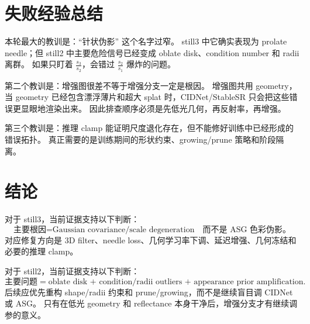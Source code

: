 \documentclass[11pt,a4paper]{article}
\begin{document}
\section{失败经验总结}

本轮最大的教训是：``针状伪影'' 这个名字过窄。
still3 中它确实表现为 prolate needle；但 still2 中主要危险信号已经变成 oblate disk、condition number 和 radii 离群。
如果只盯着 \(\frac{s_3}{s_2}\)，会错过 \(\frac{s_2}{s_1}\) 爆炸的问题。

第二个教训是：增强图很差不等于增强分支一定是根因。
增强图共用 geometry，当 geometry 已经包含漂浮薄片和超大 splat 时，CIDNet/StableSR 只会把这些错误更显眼地渲染出来。
因此排查顺序必须是先低光几何，再反射率，再增强。

第三个教训是：推理 clamp 能证明尺度退化存在，但不能修好训练中已经形成的错误拓扑。
真正需要的是训练期间的形状约束、growing/prune 策略和阶段隔离。

\section{结论}

对于 still3，当前证据支持以下判断：
\[
  \text{主要根因} =
  \text{Gaussian covariance/scale degeneration}
  \quad
  \text{而不是 ASG 色彩伪影。}
\]
对应修复方向是 3D filter、needle loss、几何学习率下调、延迟增强、几何冻结和必要的推理 clamp。

对于 still2，当前证据支持以下判断：
\[
  \text{主要问题} =
  \text{oblate disk + condition/radii outliers + appearance prior amplification}.
\]
后续应优先重构 shape/radii 约束和 prune/growing，而不是继续盲目调 CIDNet 或 ASG。
只有在低光 geometry 和 reflectance 本身干净后，增强分支才有继续调参的意义。
\end{document}
